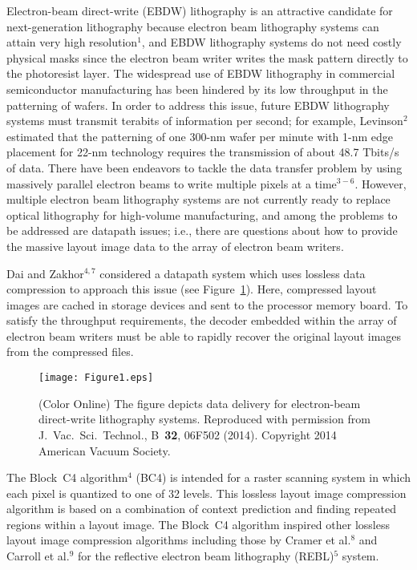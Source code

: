 \documentclass{article}
\begin{document}
Electron-beam direct-write (EBDW) lithography is an attractive candidate for
next-generation lithography because electron beam lithography systems can 
attain very high resolution$^1$, and EBDW lithography systems do not need 
costly physical masks since the electron beam writer writes the mask pattern 
directly to the photoresist layer.
The widespread use of EBDW lithography in commercial semiconductor 
manufacturing has been hindered by its low throughput in the patterning of 
wafers.  In order to address this issue, future EBDW lithography systems 
must transmit terabits of information per second;  for example, 
Levinson$^2$ estimated that the patterning
of one 300-nm wafer per minute with 1-nm edge placement for 22-nm technology
requires the transmission of about 48.7 Tbits/s of data.
There have been endeavors to tackle the data transfer problem by using
massively parallel electron beams to write multiple pixels at a time$^{3-6}$.
However, multiple electron beam lithography systems are not currently ready
to replace optical lithography for high-volume manufacturing, and among the
problems to be addressed are datapath issues; i.e., there are questions
about how to provide the massive layout image data to the array of electron
beam writers. 

Dai and Zakhor$^{4,7}$ considered a datapath system which uses lossless data 
compression to approach this issue (see Figure~\ref{fig:dai}).  
Here, compressed layout images are cached in storage devices and sent to the 
processor memory board.  To satisfy the throughput requirements,
the decoder embedded within the array of electron beam writers
must be able to rapidly recover the original layout images from the
compressed files. 

\begin{figure}
\centering
\texttt{[image: Figure1.eps]}
\caption{(Color Online) The figure depicts data delivery for electron-beam
direct-write lithography systems. Reproduced with permission from 
J.~Vac.~Sci.~Technol., B~{\bf 32}, 06F502 (2014). Copyright 2014 American
Vacuum Society.}
\label{fig:dai}
\end{figure}

The Block~C4 algorithm$^4$ (BC4) is intended for a raster 
scanning system in which each pixel is quantized to one of 32 levels. 
This lossless layout image compression algorithm is based on a combination
of context prediction and finding repeated regions within a layout image.
The Block~C4 algorithm inspired other lossless layout image compression
algorithms including those by Cramer et al.$^8$ and Carroll et al.$^9$
for the reflective electron beam lithography (REBL)$^5$ system. 
\end{document}
